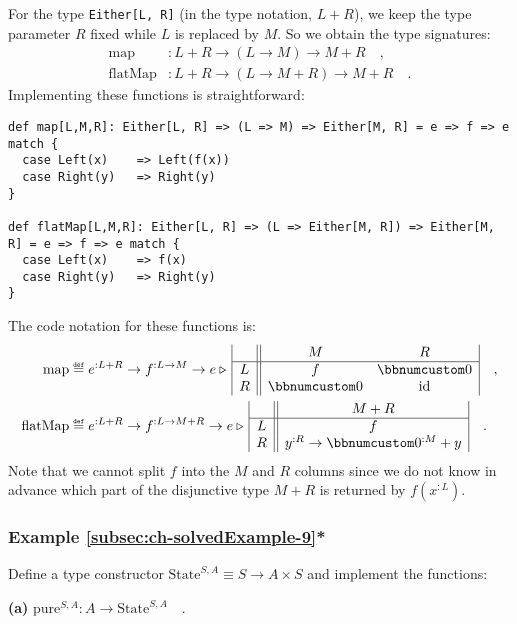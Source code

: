 For the type \lstinline!Either[L, R]! (in the type notation, $L+R$),
we keep the type parameter $R$ fixed while $L$ is replaced by $M$.
So we obtain the type signatures:
\begin{align*}
\text{map} & :L+R\rightarrow(L\rightarrow M)\rightarrow M+R\quad,\\
\text{flatMap} & :L+R\rightarrow(L\rightarrow M+R)\rightarrow M+R\quad.
\end{align*}
Implementing these functions is straightforward:
\begin{lstlisting}
def map[L,M,R]: Either[L, R] => (L => M) => Either[M, R] = e => f => e match {
  case Left(x)    => Left(f(x))
  case Right(y)   => Right(y)
}

def flatMap[L,M,R]: Either[L, R] => (L => Either[M, R]) => Either[M, R] = e => f => e match {
  case Left(x)    => f(x)
  case Right(y)   => Right(y)
}
\end{lstlisting}
The code notation for these functions is:
\begin{align*}
\text{map} & \triangleq e^{:L+R}\rightarrow f^{:L\rightarrow M}\rightarrow e\triangleright\,\begin{array}{|c||cc|}
 & M & R\\
\hline L & f & \bbnum 0\\
R & \bbnum 0 & \text{id}
\end{array}\quad,\\
\text{flatMap} & \triangleq e^{:L+R}\rightarrow f^{:L\rightarrow M+R}\rightarrow e\triangleright\,\begin{array}{|c||c|}
 & M+R\\
\hline L & f\\
R & y^{:R}\rightarrow\bbnum 0^{:M}+y
\end{array}\quad.
\end{align*}
Note that we cannot split $f$ into the $M$ and $R$ columns since
we do not know in advance which part of the disjunctive type $M+R$
is returned by $f(x^{:L})$.

\subsubsection{Example \label{subsec:ch-solvedExample-9}\ref{subsec:ch-solvedExample-9}{*}}

Define a type constructor $\text{State}^{S,A}\equiv S\rightarrow A\times S$
and implement the functions:

\textbf{(a)} $\text{pure}^{S,A}:A\rightarrow\text{State}^{S,A}\quad.$

